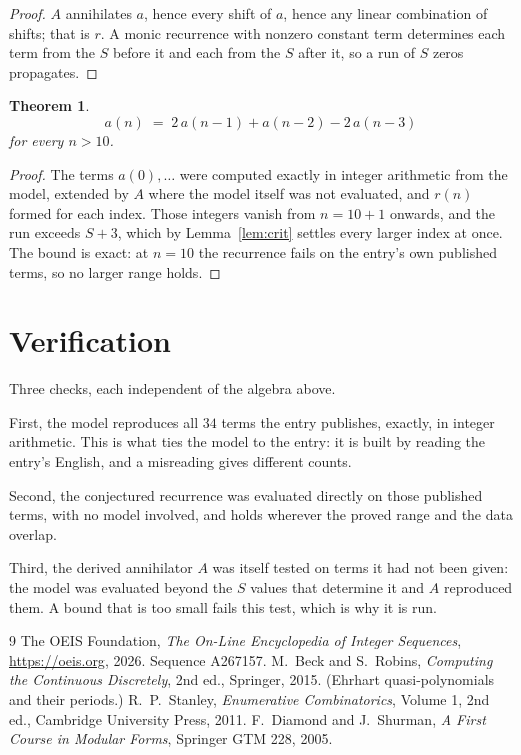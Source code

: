 \documentclass[11pt,a4paper]{article}
\theoremstyle{plain}
\newtheorem{theorem}{Theorem}
\theoremstyle{definition}
\begin{document}
\begin{proof}
$A$ annihilates $a$, hence every shift of $a$, hence any linear combination of shifts; that is
$r$. A monic recurrence with nonzero constant term determines each term from the $S$ before it
and each from the $S$ after it, so a run of $S$ zeros propagates.
\end{proof}

\begin{theorem}
\[
a(n)\;=\;2\,a(n-1) + a(n-2) - 2\,a(n-3)
\]
for every $n>10$.
\end{theorem}

\begin{proof}
The terms $a(0),\dots$ were computed exactly in integer arithmetic from the model, extended by
$A$ where the model itself was not evaluated, and $r(n)$ formed for each index. Those integers
vanish from $n=10+1$ onwards, and the run exceeds $S+3$, which by
Lemma~\ref{lem:crit} settles every larger index at once. The bound is exact: at $n=10$ the recurrence fails on the entry's own published terms, so no larger range holds.
\end{proof}

\section{Verification}

Three checks, each independent of the algebra above.

First, the model reproduces all $34$ terms the entry publishes, exactly, in integer
arithmetic. This is what ties the model to the entry: it is built by reading the entry's
English, and a misreading gives different counts.

Second, the conjectured recurrence was evaluated directly on those published terms, with no
model involved, and holds wherever the proved range and the data overlap.

Third, the derived annihilator $A$ was itself tested on terms it had not been given: the model
was evaluated beyond the $S$ values that determine it and $A$ reproduced them. A bound that is
too small fails this test, which is why it is run.

\begin{thebibliography}{9}
 The OEIS Foundation, \emph{The On-Line Encyclopedia of Integer
Sequences}, \url{https://oeis.org}, 2026. Sequence A267157.
 M.~Beck and S.~Robins, \emph{Computing the Continuous Discretely},
2nd ed., Springer, 2015. (Ehrhart quasi-polynomials and their periods.)
 R.~P.~Stanley, \emph{Enumerative Combinatorics}, Volume 1, 2nd ed.,
Cambridge University Press, 2011.
 F.~Diamond and J.~Shurman, \emph{A First Course in Modular Forms},
Springer GTM 228, 2005.
\end{thebibliography}
\end{document}
